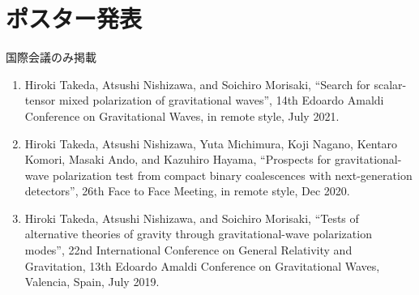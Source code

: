 \documentclass[uplatex, 12pt,a4paper]{jsarticle}
\begin{document}
\section*{ポスター発表}
国際会議のみ掲載
\begin{enumerate}
\item Hiroki Takeda, Atsushi Nishizawa, and Soichiro Morisaki, “Search for scalar-tensor mixed polarization of gravitational waves”, 14th Edoardo Amaldi Conference on Gravitational Waves, in remote style, July 2021.

\item Hiroki Takeda, Atsushi Nishizawa, Yuta Michimura, Koji Nagano, Kentaro Komori, Masaki Ando, and Kazuhiro Hayama, “Prospects for gravitational-wave polarization test from compact binary coalescences with next-generation detectors”, 26th Face to Face Meeting, in remote style, Dec 2020.

\item Hiroki Takeda, Atsushi Nishizawa, and Soichiro Morisaki, “Tests of alternative theories of gravity through gravitational-wave polarization modes”, 22nd International Conference on General Relativity and Gravitation, 13th Edoardo Amaldi Conference on Gravitational Waves, Valencia, Spain, July 2019.


\end{enumerate}

\end{document}
